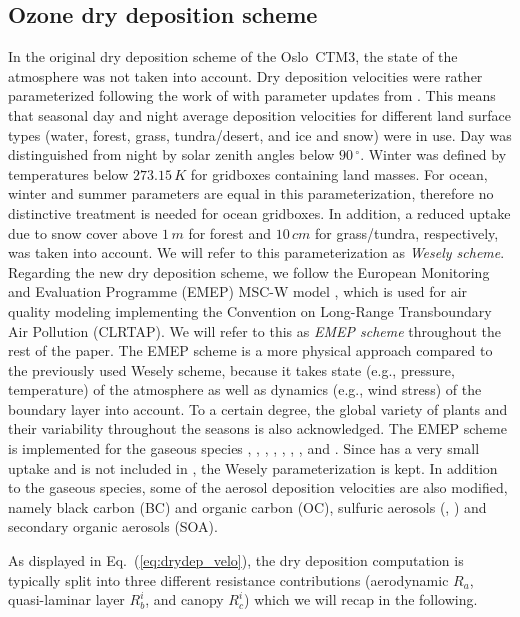 \documentclass[gmd, manuscript]{copernicus}
\begin{document}
\subsection{Ozone dry deposition scheme}
\label{subsec:DryDep}
In the original dry deposition scheme of the Oslo~CTM3, the state of the atmosphere was not taken into account. Dry deposition velocities were rather parameterized following the work of \citet{AE:Wesely1989} with parameter updates from \citet{JGR:Hough1991}. This means that seasonal day and night average deposition velocities for different land surface types (water, forest, grass, tundra/desert, and ice and snow) were in use. Day was distinguished from night by solar zenith angles below $90\,\unit{^\circ}$. Winter was defined by temperatures below $273.15\,\unit{K}$ for gridboxes containing land masses. For ocean, winter and summer parameters are equal in this parameterization, therefore no distinctive treatment is needed for ocean gridboxes. In addition, a reduced uptake due to snow cover above $1\,\unit{m}$ for forest and $10\,\unit{cm}$ for grass/tundra, respectively, was taken into account. We will refer to this parameterization as \emph{Wesely scheme}.\\

Regarding the new dry deposition scheme, we follow the European Monitoring and Evaluation Programme (EMEP) MSC-W model \citep{WASP:Simpson2003,ACP:Simpson2012}, which is used for air quality modeling implementing the Convention on Long-Range Transboundary Air Pollution (CLRTAP). We will refer to this as \emph{EMEP scheme} throughout the rest of the paper. The EMEP scheme is a more physical approach compared to the previously used Wesely scheme, because it takes state (e.g., pressure, temperature)  of the atmosphere as well as dynamics (e.g., wind stress) of the boundary layer into account. To a certain degree, the global variety of plants and their variability throughout the seasons is also acknowledged. The EMEP scheme is implemented for the gaseous species , , , , , , , and . Since  has a very small uptake and is not included in \citet{WASP:Simpson2003,ACP:Simpson2012}, the Wesely parameterization is kept. In addition to the gaseous species, some of the aerosol deposition velocities are also modified, namely black carbon (BC) and organic carbon (OC), sulfuric aerosols (, ) and secondary organic aerosols (SOA).

As displayed in Eq.~(\ref{eq:drydep_velo}), the dry deposition computation is typically split into three different resistance contributions (aerodynamic $R_a$, quasi-laminar layer $R^i_b$, and canopy $R^i_c$) which we will recap in the following.
\end{document}
